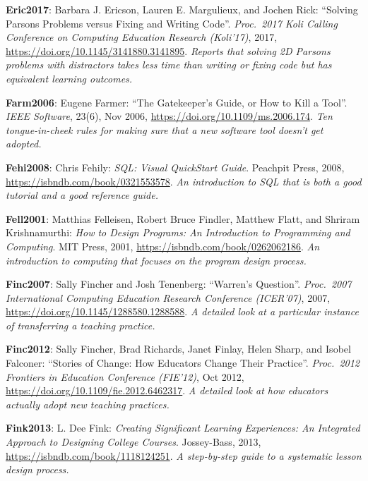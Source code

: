 \textbf{\hypertarget{b:Eric2017}{Eric2017}\label{b:Eric2017}}: Barbara J. Ericson, Lauren E. Margulieux, and Jochen Rick: ``Solving Parsons Problems versus Fixing and Writing Code''. \emph{Proc.\ 2017 Koli Calling Conference on Computing Education Research (Koli'17)}, 2017, \url{https://doi.org/10.1145/3141880.3141895}. \emph{Reports that solving 2D Parsons problems with distractors takes less time than writing or fixing code but has equivalent learning outcomes.}

\textbf{\hypertarget{b:Farm2006}{Farm2006}\label{b:Farm2006}}: Eugene Farmer: ``The Gatekeeper's Guide, or How to Kill a Tool''. \emph{IEEE Software}, 23(6), Nov 2006, \url{https://doi.org/10.1109/ms.2006.174}. \emph{Ten tongue-in-cheek rules for making sure that a new software tool doesn't get adopted.}

\textbf{\hypertarget{b:Fehi2008}{Fehi2008}\label{b:Fehi2008}}: Chris Fehily: \emph{SQL: Visual QuickStart Guide}. Peachpit Press, 2008, \url{https://isbndb.com/book/0321553578}. \emph{An introduction to SQL that is both a good tutorial and a good reference guide.}

\textbf{\hypertarget{b:Fell2001}{Fell2001}\label{b:Fell2001}}: Matthias Felleisen, Robert Bruce Findler, Matthew Flatt, and Shriram Krishnamurthi: \emph{How to Design Programs: An Introduction to Programming and Computing}. MIT Press, 2001, \url{https://isbndb.com/book/0262062186}. \emph{An introduction to computing that focuses on the program design process.}

\textbf{\hypertarget{b:Finc2007}{Finc2007}\label{b:Finc2007}}: Sally Fincher and Josh Tenenberg: ``Warren's Question''. \emph{Proc.\ 2007 International Computing Education Research Conference (ICER'07)}, 2007, \url{https://doi.org/10.1145/1288580.1288588}. \emph{A detailed look at a particular instance of transferring a teaching practice.}

\textbf{\hypertarget{b:Finc2012}{Finc2012}\label{b:Finc2012}}: Sally Fincher, Brad Richards, Janet Finlay, Helen Sharp, and Isobel Falconer: ``Stories of Change: How Educators Change Their Practice''. \emph{Proc.\ 2012 Frontiers in Education Conference (FIE'12)}, Oct 2012, \url{https://doi.org/10.1109/fie.2012.6462317}. \emph{A detailed look at how educators actually adopt new teaching practices.}

\textbf{\hypertarget{b:Fink2013}{Fink2013}\label{b:Fink2013}}: L. Dee Fink: \emph{Creating Significant Learning Experiences: An Integrated Approach to Designing College Courses}. Jossey-Bass, 2013, \url{https://isbndb.com/book/1118124251}. \emph{A step-by-step guide to a systematic lesson design process.}

